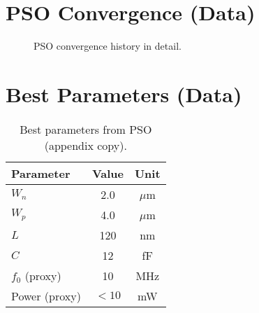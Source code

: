 \section{PSO Convergence (Data)}
\begin{figure}[H]
  \centering
  \caption{PSO convergence history in detail.}
\end{figure}

\section{Best Parameters (Data)}
\begin{table}[H]
  \centering
  \caption{Best parameters from PSO (appendix copy).}
  \begin{tabular}{lcc}
    \toprule
    Parameter & Value & Unit \\
    \midrule
    $W_n$ & 2.0 & $\mu$m \\
    $W_p$ & 4.0 & $\mu$m \\
    $L$   & 120 & nm \\
    $C$   & 12  & fF \\
    $f_0$ (proxy) & 10 & MHz \\
    Power (proxy) & $<10$ & mW \\
    \bottomrule
  \end{tabular}
\end{table}